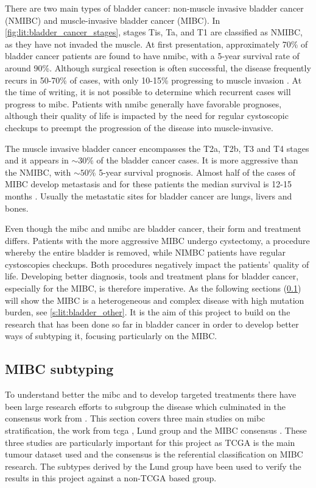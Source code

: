 There are two main types of bladder cancer: non-muscle invasive bladder cancer (NMIBC) and muscle-invasive bladder cancer (MIBC). In \cref{fig:lit:bladder_cancer_stages}, stages Tis, Ta, and T1 are classified as NMIBC, as they have not invaded the muscle. At first presentation, approximately 70\% of bladder cancer patients are found to have \acrfull{nmibc}, with a 5-year survival rate of around 90\%. Although surgical resection is often successful, the disease frequently recurs in 50-70\% of cases, with only 10-15\% progressing to muscle invasion \cite{Knowles2015-mu}. At the time of writing, it is not possible to determine which recurrent cases will progress to \acrlong{mibc}. Patients with \acrshort{nmibc} generally have favorable prognoses, although their quality of life is impacted by the need for regular cystoscopic checkups to preempt the progression of the disease into muscle-invasive.


The muscle invasive bladder cancer encompasses the T2a, T2b, T3 and T4 stages and it appears in $\sim30\%$ of the bladder cancer cases. It is more aggressive than the NMIBC, with $\sim50\%$ 5-year survival prognosis. Almost half of the cases of MIBC develop metastasis and for these patients the median survival is 12-15 months \cite{Knowles2015-mu}. Usually the metastatic sites for bladder cancer are lungs, livers and bones.

Even though the \acrshort{mibc} and \acrshort{nmibc} are bladder cancer, their form and treatment differs. Patients with the more aggressive MIBC undergo cystectomy, a procedure whereby the entire bladder is removed, while NIMBC patients have regular cystoscopies checkups. Both procedures negatively impact the patients' quality of life. Developing better diagnosis, tools and treatment plans for bladder cancer, especially for the MIBC, is therefore imperative. As the following sections (\cref{s:lit:subtypes_mibc}) will show the MIBC is a heterogeneous and complex disease with high mutation burden, see \cref{s:lit:bladder_other}. It is the aim of this project to build on the research that has been done so far in bladder cancer in order to develop better ways of subtyping it, focusing particularly on the MIBC.

\subsection{MIBC subtyping} \label{s:lit:subtypes_mibc}

To understand better the \acrlong{mibc} and to develop targeted treatments there have been large research efforts to subgroup the disease which culminated in the consensus work from \citet{Kamoun2020-tj}. This section covers three main studies on \acrshort{mibc} stratification, the work from \acrshort{tcga} \cite{Robertson2017-mg}, Lund group \cite{Marzouka2018-ge} and the MIBC consensus \cite{Kamoun2020-tj}. These three studies are particularly important for this project as TCGA is the main tumour dataset used and the consensus is the referential classification on MIBC research. The subtypes derived by the Lund group have been used to verify the results in this project against a non-TCGA based group.

